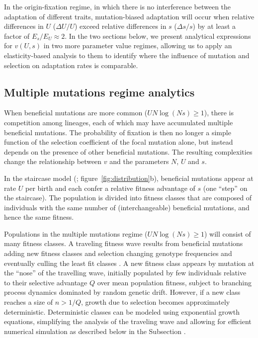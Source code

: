 \documentclass[9pt,twocolumn,twoside]{article}
\begin{document}
In the origin-fixation regime, in which there is no interference between the adaptation of different traits, mutation-biased adaptation will occur when relative differences in $U$ ($\Delta U/U$) exceed relative differences in $s$ ($\Delta s/s$) by at least a factor of $E_s/E_U\approx2$. In the two sections below, we present analytical expressions for $v(U,s)$ in two more parameter value regimes, allowing us to apply an elasticity-based analysis to them to identify where the influence of mutation and selection on adaptation rates is comparable.


\subsection{Multiple mutations regime analytics}\label{subsec:materials:1danalytics}

When beneficial mutations are more common ($UN \log(Ns) \geq 1$), there is competition among lineages, each of which may have accumulated multiple beneficial mutations. The probability of fixation is then no longer a simple function of the selection coefficient of the focal mutation alone, but instead depends on the presence of other beneficial mutations. The resulting complexities change the relationship between $v$ and the parameters $N$, $U$ and $s$.

In the staircase model (\citealt{Desai2013}; figure~\ref{fig:distribution}b), beneficial mutations appear at rate $U$ per birth and each confer a relative fitness advantage of $s$ (one ``step'' on the staircase). The population is divided into fitness classes that are composed of individuals with the same number of (interchangeable) beneficial mutations, and hence the same fitness.

Populations in the multiple mutations regime ($UN \log(Ns)\geq 1$) will consist of many fitness classes. A traveling fitness wave results from beneficial mutations adding new fitness classes and selection changing genotype frequencies and eventually culling the least fit classes \citep{desai2007beneficial}. A new fitness class appears by mutation at the ``nose'' of the travelling wave, initially populated by few individuals relative to their selective advantage $Q$ over mean population fitness, subject to branching process dynamics dominated by random genetic drift. However, if a new class reaches a size of $n>1/Q$, growth due to selection becomes approximately deterministic. Deterministic classes can be modeled using exponential growth equations, simplifying the analysis of the traveling wave and allowing for efficient numerical simulation as described below in the Subsection .
\end{document}
